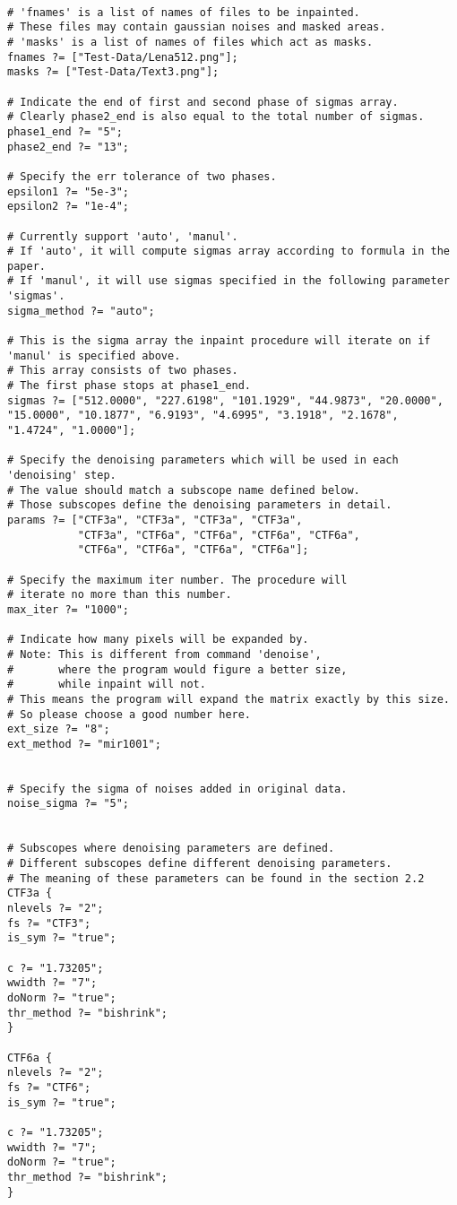 \documentclass[a4paper,5pt]{article}
\begin{document}
\begin{lstlisting}

# 'fnames' is a list of names of files to be inpainted. 
# These files may contain gaussian noises and masked areas.
# 'masks' is a list of names of files which act as masks.
fnames ?= ["Test-Data/Lena512.png"];
masks ?= ["Test-Data/Text3.png"];

# Indicate the end of first and second phase of sigmas array.
# Clearly phase2_end is also equal to the total number of sigmas.
phase1_end ?= "5";
phase2_end ?= "13";

# Specify the err tolerance of two phases.
epsilon1 ?= "5e-3";
epsilon2 ?= "1e-4";

# Currently support 'auto', 'manul'.
# If 'auto', it will compute sigmas array according to formula in the paper.
# If 'manul', it will use sigmas specified in the following parameter 'sigmas'.
sigma_method ?= "auto";

# This is the sigma array the inpaint procedure will iterate on if 'manul' is specified above.
# This array consists of two phases.
# The first phase stops at phase1_end.
sigmas ?= ["512.0000", "227.6198", "101.1929", "44.9873", "20.0000",  "15.0000", "10.1877", "6.9193", "4.6995", "3.1918", "2.1678", "1.4724", "1.0000"];

# Specify the denoising parameters which will be used in each 'denoising' step.
# The value should match a subscope name defined below. 
# Those subscopes define the denoising parameters in detail.
params ?= ["CTF3a", "CTF3a", "CTF3a", "CTF3a", 
           "CTF3a", "CTF6a", "CTF6a", "CTF6a", "CTF6a", 
           "CTF6a", "CTF6a", "CTF6a", "CTF6a"];

# Specify the maximum iter number. The procedure will
# iterate no more than this number.
max_iter ?= "1000";

# Indicate how many pixels will be expanded by.
# Note: This is different from command 'denoise', 
#       where the program would figure a better size,
#       while inpaint will not.
# This means the program will expand the matrix exactly by this size. 
# So please choose a good number here.
ext_size ?= "8";
ext_method ?= "mir1001";


# Specify the sigma of noises added in original data.
noise_sigma ?= "5";


# Subscopes where denoising parameters are defined.
# Different subscopes define different denoising parameters.
# The meaning of these parameters can be found in the section 2.2
CTF3a {
nlevels ?= "2";
fs ?= "CTF3";
is_sym ?= "true";

c ?= "1.73205";
wwidth ?= "7";
doNorm ?= "true";
thr_method ?= "bishrink";
}

CTF6a {
nlevels ?= "2";
fs ?= "CTF6";
is_sym ?= "true";

c ?= "1.73205";
wwidth ?= "7";
doNorm ?= "true";
thr_method ?= "bishrink";
}

\end{lstlisting}
\end{document}
